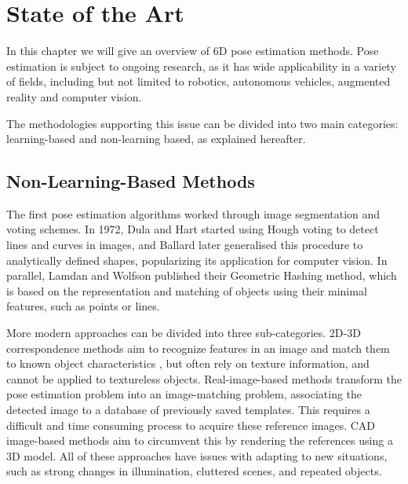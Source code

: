 \chapter{State of the Art}
\label{ch:state_of_the_art}

In this chapter we will give an overview of 6D pose estimation methods. Pose estimation is subject to ongoing research, as it has wide applicability in a variety of fields, including but not limited to robotics, autonomous vehicles, augmented reality and computer vision.

The methodologies supporting this issue can be divided into two main categories: learning-based and non-learning based, as explained hereafter.

\section{Non-Learning-Based Methods}
\label{s:notlearningbasedmethods}

The first pose estimation algorithms worked through image segmentation and voting schemes. In 1972, Dula and Hart started using Hough\cite{Hough} voting to detect lines and curves in images\cite{HoughLines}, and Ballard later generalised this procedure to analytically defined shapes\cite{generalisedHough}, popularizing its application for computer vision. In parallel, Lamdan and Wolfson published their Geometric Hashing\cite{GHashing} method, which is based on the representation and matching of objects using their minimal features, such as points or lines.

More modern approaches can be divided into three sub-categories. 2D-3D correspondence methods aim to recognize features in an image and match them to known object characteristics \cite{SURF}, but often rely on texture information, and cannot be applied to textureless objects. Real-image-based methods\cite{ImageMatching} transform the pose estimation problem into an image-matching problem, associating the detected image to a database of previously saved templates. This requires a difficult and time consuming process to acquire these reference images. CAD image-based methods\cite{CADMatching} aim to circumvent this by rendering the references using a 3D model. All of these approaches have issues with adapting to new situations, such as strong changes in illumination, cluttered scenes, and repeated objects.

